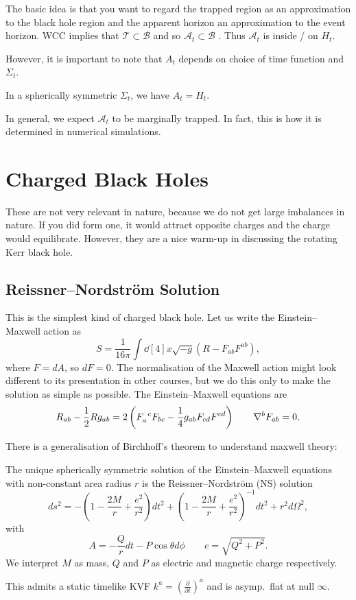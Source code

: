The basic idea is that you want to regard the trapped region as an approximation to the black hole region and the apparent horizon an approximation to the event horizon.
WCC implies that $\mathcal{T} \subset \mathcal{B}$  and so $\mathcal{A}_t \subset \mathcal{B}$ . Thus $\mathcal{A}_t$  is inside / on $H_t$.

However, it is important to note that  $A_t$  depends on choice of time function and $\Sigma_t$.
 \begin{example}[Kruskal]
  In a spherically symmetric $\Sigma_t$, we have $A_t = H_t$.
\end{example}
In general, we expect $\mathcal{A}_t$  to be marginally trapped. In fact, this is how it is determined in numerical simulations.


\chapter{Charged Black Holes}%
\label{cha:charged_black_holes}

These are not very relevant in nature, because we do not get large imbalances in nature. If you did form one, it would attract opposite charges and the charge would equilibrate.
However, they are a nice warm-up in discussing the rotating Kerr black hole.

\section{Reissner--Nordström Solution}%
\label{sec:reissner_nordstrom_solution}

This is the simplest kind of charged black hole.
Let us write the Einstein--Maxwell action as
\begin{equation}
  S = \frac{1}{16 \pi} \int \dd[4]{x} \sqrt{-g} \left( R - F_{ab} F^{ab} \right),
\end{equation}
where $F = dA$, so $dF = 0$.
The normalisation of the Maxwell action might look different to its presentation in other courses, but we do this only to make the solution as simple as possible.
The Einstein--Maxwell equations are
\begin{equation}
  R_{ab} - \frac{1}{2} R g_{ab} = 2 \left( F\indices{_{a}^{c}} F_{bc} - \frac{1}{4} g_{ab} F_{cd} F^{cd} \right) \qquad \nabla^{b} F_{ab} = 0.
\end{equation}

There is a generalisation of Birchhoff's theorem to understand maxwell theory:
\begin{theorem}[]
  The unique spherically symmetric solution of the Einstein--Maxwell equations with non-constant area radius $r$ is the Reissner--Nordström (NS) solution
  \begin{equation}
  ds^2 = -\left( 1 - \frac{2M}{r} + \frac{e^2}{r^2} \right) dt^2 + \left( 1 - \frac{2M}{r} + \frac{e^2}{r^2} \right)^{-1} dt^2 + r^2 d\Omega^2,
  \end{equation}
  with
  \begin{equation}
    A = -\frac{Q}{r} dt - P \cos \theta d\phi \qquad e = \sqrt{Q^2 + P^2}.
  \end{equation}
  We interpret $M$ as mass, $Q$ and $P$ as electric and magnetic charge respectively.
\end{theorem}

This admits a static timelike KVF $k^a = \left( \frac{\partial }{\partial t} \right)^a$ and is asymp.~flat at null $\infty$.

